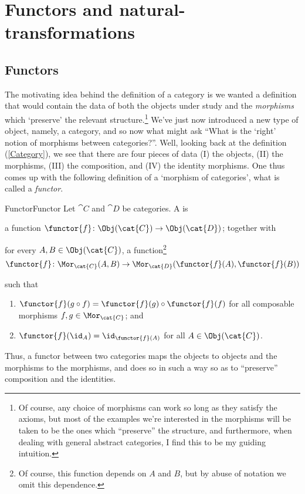 \section{Functors and natural-transformations}

\subsection{Functors}

The motivating idea behind the definition of a category is we wanted a definition that would contain the data of both the objects under study and the \emph{morphisms} which `preserve' the relevant structure.\footnote{Of course, any choice of morphisms can work so long as they satisfy the axioms, but most of the examples we're interested in the morphisms will be taken to be the ones which ``preserve'' the structure, and furthermore, when dealing with general abstract categories, I find this to be my guiding intuition.}  We've just now introduced a new type of object, namely, a category, and so now what might ask ``What is the `right' notion of morphisms between categories?''.  Well, looking back at the definition (\cref{Category}), we see that there are four pieces of data (I) the objects, (II) the morphisms, (III) the composition, and (IV) the identity morphisms.  One thus comes up with the following definition of a `morphism of categories', what is called a \emph{functor}.
\begin{dfn}{Functor}{Functor}
	Let $\cat{C}$ and $\cat{D}$ be categories.  A  is
	\begin{data}
		\item a function $\functor{f}\colon \Obj (\cat{C})\rightarrow \Obj (\cat{D})$; together with
		\item for every $A,B\in \Obj (\cat{C})$, a function\footnote{Of course, this function depends on $A$ and $B$, but by abuse of notation we omit this dependence.}
		\begin{equation}
			\functor{f}\colon \Mor _{\cat{C}}(A,B)\rightarrow \Mor _{\cat{D}}(\functor{f}(A),\functor{f}(B))
		\end{equation}
	\end{data}
	such that
	\begin{enumerate}
		\item $\functor{f}(g\circ f)=\functor{f}(g)\circ \functor{f}(f)$ for all composable morphisms $f,g\in \Mor _{\cat{C}}$; and
		\item $\functor{f}(\id _A)=\id _{\functor{f}(A)}$ for all $A\in \Obj (\cat{C})$.
	\end{enumerate}
	\begin{rmk}
		Thus, a functor between two categories maps the objects to objects and the morphisms to the morphisms, and does so in such a way so as to ``preserve'' composition and the identities.
	\end{rmk}
\end{dfn}
